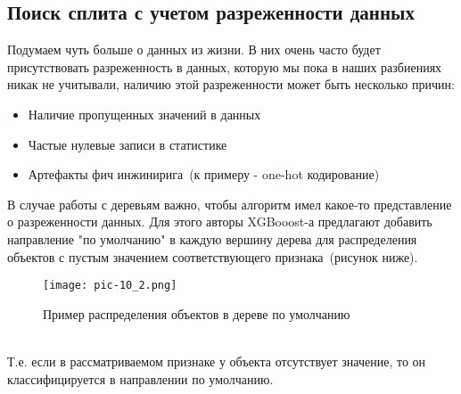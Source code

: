 \documentclass[12pt,fleqn]{article}
\begin{document}
\subsection{Поиск сплита с учетом разреженности данных}
Подумаем чуть больше о данных из жизни. В них очень часто будет присутствовать разреженность в данных, которую мы пока в наших разбиениях никак не учитывали, наличию этой разреженности может быть несколько причин:
\begin{itemize}
	\item Наличие пропущенных значений в данных
	\item Частые нулевые записи в статистике
	\item Артефакты фич инжинирига~(к примеру - one-hot кодирование)
\end{itemize}
В случае работы с деревьям важно, чтобы алгоритм имел какое-то представление о разреженности данных. Для этого авторы XGBooost-а предлагают добавить направление "по умолчанию" в каждую вершину дерева для распределения объектов с пустым значением соответствующего признака~(рисунок ниже).
\begin{figure}[h]
	\centering
	\texttt{[image: pic-10\_2.png]}
	\caption{Пример распределения объектов в дереве по умолчанию}
	\label{fig:terms_2}
\end{figure}\\
Т.е. если в рассматриваемом признаке у объекта отсутствует значение, то он классифицируется в направлении по умолчанию.\\
\end{document}
